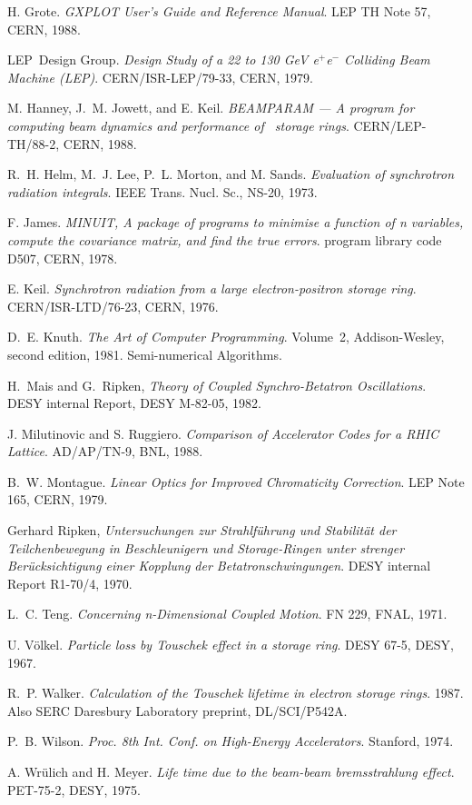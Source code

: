 \begin{thebibliography}{10}
H. Grote.
{\sl GXPLOT User's Guide and Reference Manual}.
LEP TH Note 57, CERN, 1988.
 
LEP~Design Group.
{\sl Design Study of a 22 to 130 GeV e\({}^{+}\)e\({}^{-}\) Colliding Beam
  Machine (LEP)}.
CERN/ISR-LEP/79-33, CERN, 1979.
 
M. Hanney, J.~M. Jowett, and E. Keil.
{\sl BEAMPARAM --- A program for computing beam dynamics and
  performance of \epem\ storage rings}.
CERN/LEP-TH/88-2, CERN, 1988.
 
R.~H. Helm, M.~J. Lee, P.~L. Morton, and M. Sands.
{\sl Evaluation of synchrotron radiation integrals}.
IEEE Trans. Nucl. Sc., NS-20, 1973.
 
F. James.
{\sl MINUIT, A package of programs to minimise a function of n
  variables, compute the covariance matrix, and find the true errors}.
program library code D507, CERN, 1978.
 
E. Keil.
{\sl Synchrotron radiation from a large electron-positron storage ring}.
CERN/ISR-LTD/76-23, CERN, 1976.
 
D.~E. Knuth.
{\sl The Art of Computer Programming}.
Volume~2, Addison-Wesley, second edition, 1981.
Semi-numerical Algorithms.

H.~Mais and G.~Ripken,
{\sl Theory of Coupled Synchro-Betatron Oscillations}.
DESY internal Report, DESY M-82-05, 1982.

J. Milutinovic and S. Ruggiero.
{\sl Comparison of Accelerator Codes for a RHIC Lattice}.
AD/AP/TN-9, BNL, 1988.
 
B.~W. Montague.
{\sl Linear Optics for Improved Chromaticity Correction}.
LEP Note 165, CERN, 1979.

Gerhard Ripken,
{\sl Untersuchungen zur Strahlf\"uhrung und Stabilit\"at der
Teilchenbewegung in Beschleunigern und Storage-Ringen unter strenger
Ber\"ucksichtigung einer Kopplung der Betatronschwingungen}.
DESY internal Report R1-70/4, 1970.
 
L.~C. Teng.
{\sl Concerning n-Dimensional Coupled Motion}.
FN 229, FNAL, 1971.
 
U. V\"olkel.
{\sl Particle loss by Touschek effect in a storage ring}.
DESY 67-5, DESY, 1967.
 
R.~P. Walker.
{\sl Calculation of the Touschek lifetime in electron storage rings}.
1987.
Also SERC Daresbury Laboratory preprint, DL/SCI/P542A.
 
P.~B. Wilson.
{\sl Proc. 8th Int. Conf. on High-Energy Accelerators}.
Stanford, 1974.
 
A. Wr\"ulich and H. Meyer.
{\sl Life time due to the beam-beam bremsstrahlung effect}.
PET-75-2, DESY, 1975.
 
\end{thebibliography}

\printindex


